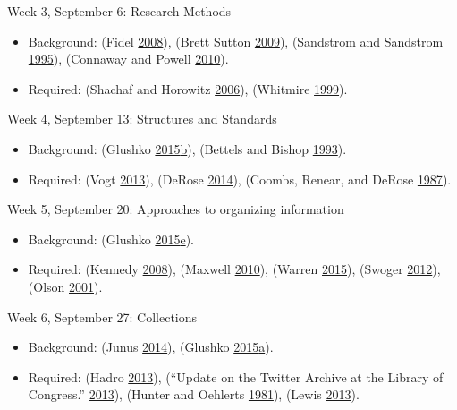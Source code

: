 \documentclass[]{article}
\providecommand{\tightlist}{%
  \setlength{\itemsep}{0pt}\setlength{\parskip}{0pt}}
\begin{document}
Week 3, September 6: Research Methods

\begin{itemize}
\tightlist
\item
  Background: (Fidel
  \protect\hyperlink{ref-fidelux5fareux5f2008}{2008}), (Brett Sutton
  \protect\hyperlink{ref-brettux5fsuttonux5fqualitativeux5f2009}{2009}),
  (Sandstrom and Sandstrom
  \protect\hyperlink{ref-sandstromux5fuseux5f1995}{1995}), (Connaway and
  Powell \protect\hyperlink{ref-connawayux5fselectingux5f2010}{2010}).
\item
  Required: (Shachaf and Horowitz
  \protect\hyperlink{ref-shachafux5fareux5f2006}{2006}), (Whitmire
  \protect\hyperlink{ref-whitmireux5fracialux5f1999}{1999}).
\end{itemize}

Week 4, September 13: Structures and Standards

\begin{itemize}
\tightlist
\item
  Background: (Glushko
  \protect\hyperlink{ref-glushkoux5fdescribingux5f2015}{2015}\protect\hyperlink{ref-glushkoux5fdescribingux5f2015}{b}),
  (Bettels and Bishop
  \protect\hyperlink{ref-bettelsux5funicode:ux5f1993}{1993}).
\item
  Required: (Vogt
  \protect\hyperlink{ref-vogtux5fescienceux5f2013}{2013}), (DeRose
  \protect\hyperlink{ref-deroseux5fwhatux5f2014}{2014}), (Coombs,
  Renear, and DeRose
  \protect\hyperlink{ref-coombsux5fmarkupux5f1987}{1987}).
\end{itemize}

Week 5, September 20: Approaches to organizing information

\begin{itemize}
\tightlist
\item
  Background: (Glushko
  \protect\hyperlink{ref-glushkoux5fresourcesux5f2015}{2015}\protect\hyperlink{ref-glushkoux5fresourcesux5f2015}{e}).
\item
  Required: (Kennedy
  \protect\hyperlink{ref-kennedyux5fnineux5f2008}{2008}), (Maxwell
  \protect\hyperlink{ref-maxwellux5fbibliographicux5f2010}{2010}),
  (Warren \protect\hyperlink{ref-warrenux5f2015ux5f2015}{2015}), (Swoger
  \protect\hyperlink{ref-swogerux5fwhatux5f2012}{2012}), (Olson
  \protect\hyperlink{ref-olsonux5fpowerux5f2001}{2001}).
\end{itemize}

Week 6, September 27: Collections

\begin{itemize}
\tightlist
\item
  Background: (Junus
  \protect\hyperlink{ref-junusux5fdigitalux5f2014}{2014}), (Glushko
  \protect\hyperlink{ref-glushkoux5factivitiesux5f2015}{2015}\protect\hyperlink{ref-glushkoux5factivitiesux5f2015}{a}).
\item
  Required: (Hadro
  \protect\hyperlink{ref-hadroux5fwhatsux5f2013}{2013}), (``Update on
  the Twitter Archive at the Library of Congress.''
  \protect\hyperlink{ref-ux5fupdateux5f2013}{2013}), (Hunter and
  Oehlerts \protect\hyperlink{ref-hunterux5ftwoux5f1981}{1981}), (Lewis
  \protect\hyperlink{ref-lewisux5fstacksux5f2013}{2013}).
\end{itemize}
\end{document}
